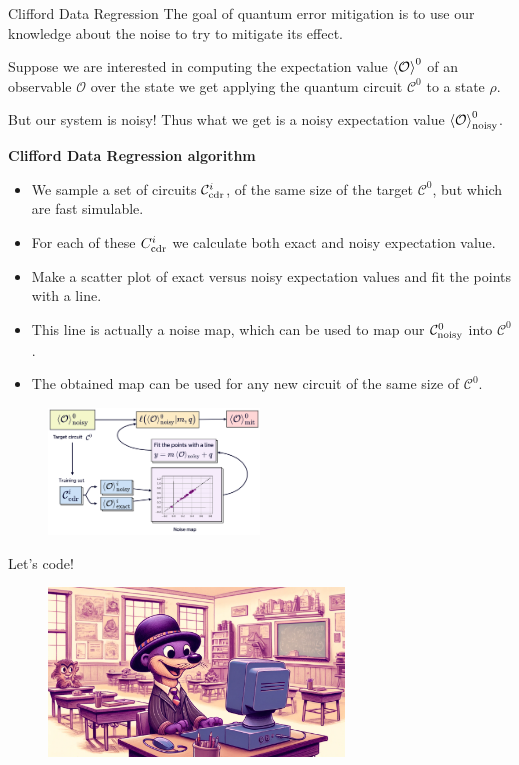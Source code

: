 \documentclass[aspectratio=169, 8pt, xcolor={svgnames}, hyperref={linkcolor=black}]{beamer}
\begin{document}
\begin{frame}{Clifford Data Regression}
\textcolor{carnelian}{The goal of quantum error mitigation is to use our knowledge about 
the noise to try to mitigate its effect.} \pause

Suppose we are interested in computing the expectation value $\braket{\mathcal{O}}^0$ 
of an observable $\mathcal{O}$
over the state we get applying the quantum circuit $\mathcal{C}^0$ to a state $\rho$. \pause

But our system is noisy! Thus what we get is a noisy expectation value $\braket{\mathcal{O}}^0_{\rm noisy}$. \pause

\begin{multicols}{2}
\textbf{Clifford Data Regression algorithm}
\begin{itemize}[noitemsep]
\item[1.] We sample a set of circuits $\mathcal{C}^i_{\rm cdr}$, of the 
same size of the target $\mathcal{C}^0$, but which are fast simulable.
\item[2.] For each of these $C^i_{\rm cdr}$ we calculate both exact and 
noisy expectation value.
\item[3.] Make a scatter plot of exact versus noisy expectation values and fit 
the points with a line.
\item[4.] This line is actually a noise map, which can be used to map our $\mathcal{C}^0_{\rm noisy}$
into $\mathcal{C}^0$.
\item[5.] The obtained map can be used for any new circuit of the same size of $\mathcal{C}^0$.
\end{itemize}
\begin{figure}
    \includegraphics[width=0.5\textwidth]{figures/cdr.png}
\end{figure}
\end{multicols}

\end{frame}

\begin{frame}
\centering
\Huge Let's code!
\begin{figure}
   \includegraphics[width=0.7\textwidth]{figures/hands_on.png}
\end{figure}
\end{frame}
\end{document}

